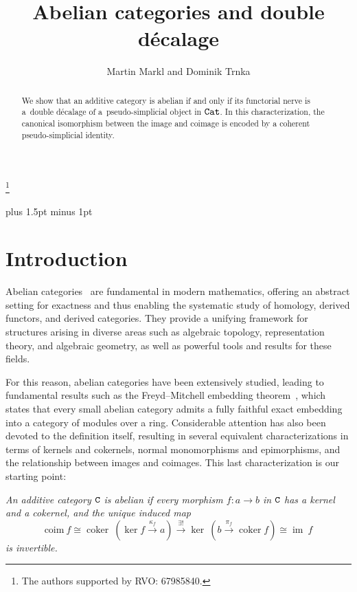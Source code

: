 \documentclass[12pt,leqno]{amsart}
\title[Abelian categories and double d\'ecalage]
{Abelian categories and double d\'ecalage}
\author[M.\ Markl, D.\ Trnka]{Martin Markl and Dominik Trnka}
\theoremstyle{definition}
\newcommand{\C}{{\tt C}}
\newcommand{\Cat}{{\tt Cat}}
\newcommand{\4}{\texttt{4}}
\DeclareMathOperator{\coker}{coker}
\DeclareMathOperator{\im}{im}
\begin{document}
\begin{abstract}
We show that an additive category is abelian if and
only if its functorial nerve is a~double d\'ecalage of
a~pseudo-simplicial object in $\Cat$. In this characterization, the
canonical isomorphism between the image and coimage is
encoded by a coherent pseudo-simplicial identity.
\end{abstract}

\thanks{The authors supported by  RVO: 67985840.}
\address{Institute of Mathematics, The Czech Academy of Sciences, \v
  Zitna 25, 110 00 Praha, Czech Republic}

\maketitle

\baselineskip 17pt plus 1.5pt minus 1pt

\tableofcontents

\section*{Introduction}

Abelian categories~\cite{Freyd,maclane} are fundamental in modern
mathematics, offering an abstract setting for exactness and thus
enabling the systematic study of homology, derived functors, and
derived categories. They provide a unifying framework for structures arising
in diverse areas such as algebraic topology, representation theory,
and algebraic geometry, as well as  powerful tools and results for
these fields.

For this reason, abelian categories have been extensively studied,
leading to fundamental results such as the Freyd–Mitchell embedding
theorem~\cite{Freyd}, which states that every small abelian category 
admits a fully faithful exact embedding into a category of modules over a
ring. Considerable attention has also been devoted to the definition
itself, resulting in several equivalent characterizations in terms of
kernels and cokernels, normal monomorphisms and epimorphisms, and the
relationship between images and coimages. This last characterization
is our starting point:

\noindent\textit{An additive category $\C$ is abelian if every
  morphism $f\colon a\to b$ in $\C$ has a kernel and a cokernel, and
  the unique induced map
\begin{equation}
\label{abelian isomorphism}
  \mathrm{coim} \  f \cong \coker \ (\ker f \stackrel{\kappa_f}\longrightarrow    a)
\stackrel{\exists!} \longrightarrow \ker \ (b \stackrel{\pi_f}\longrightarrow 
\coker f) \cong  \im \  f
\end{equation}} 
\textit{is invertible.}
\end{document}
